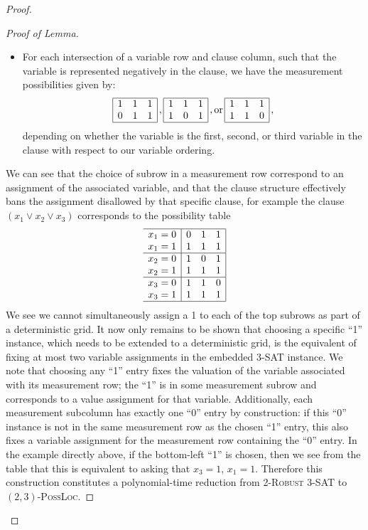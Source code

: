 \documentclass[reprint]{revtex4-1}
\theoremstyle{definition}
\begin{document}
\begin{proof}
\begin{proof}[Proof of Lemma]
\begin{itemize}
\item For each intersection of a variable row and clause column, such that the variable is represented negatively in the clause, we have the measurement possibilities given by:
\begin{equation*}
\begin{array}{  | c c  c|}
\hline
 1 & 1 & 1 \\
 0 & 1& 1 \\ \hline
 \end{array}\, ,
 \begin{array}{  | c c  c|}
\hline
 1 &1 & 1 \\
 1 & 0& 1 \\ \hline
 \end{array} \, ,
 \mbox{or} \,
 \begin{array}{  | c c  c|}
\hline
 1 & 1 & 1\\
 1 & 1& 0 \\ \hline
 \end{array}\, ,
 \end{equation*}
depending on whether the variable is the first, second, or third variable in the clause with respect to our variable ordering.
\end{itemize}
We can see that the choice of subrow in a measurement row correspond to an assignment of the associated variable, and that the clause structure effectively bans the assignment disallowed by that specific clause, for example the clause $(x_1 \vee x_2 \vee x_3)$ corresponds to the possibility table
\begin{equation*}
\begin{array}{c  | c c  c|}
\hline
 x_1=0&0 & 1 & 1 \\
 x_1=1&1 & 1& 1 \\ \hline
 x_2=0&1 &0 & 1 \\
x_2=1& 1 & 1& 1 \\ \hline
x_3=0& 1 & 1 & 0\\
x_3=1& 1 & 1& 1 \\ \hline
 \end{array}
 \end{equation*}
We see we cannot simultaneously assign a 1 to each of the top subrows as part of a deterministic grid. It now only remains to be shown that choosing a specific ``1'' instance, which needs to be extended to a deterministic grid, is the equivalent of fixing at most two variable assignments in the embedded \textsc{3-SAT} instance. We note that choosing any ``1'' entry fixes the valuation of the variable associated with its measurement row; the ``1'' is in some measurement subrow and corresponds to a value assignment for that variable. Additionally, each measurement subcolumn has exactly one ``0'' entry by construction: if this ``0'' instance is not in the same measurement row as the chosen ``1'' entry, this also fixes a variable assignment for the measurement row containing the ``0'' entry. In the example directly above, if the bottom-left ``1'' is chosen, then we see from the table that this is equivalent to asking that $x_3=1$, $x_1=1$. Therefore this construction constitutes a polynomial-time reduction from \textsc{2-Robust 3-SAT} to $(2,3)$\textsc{-PossLoc}.

\end{proof}
\end{proof}
\end{document}
